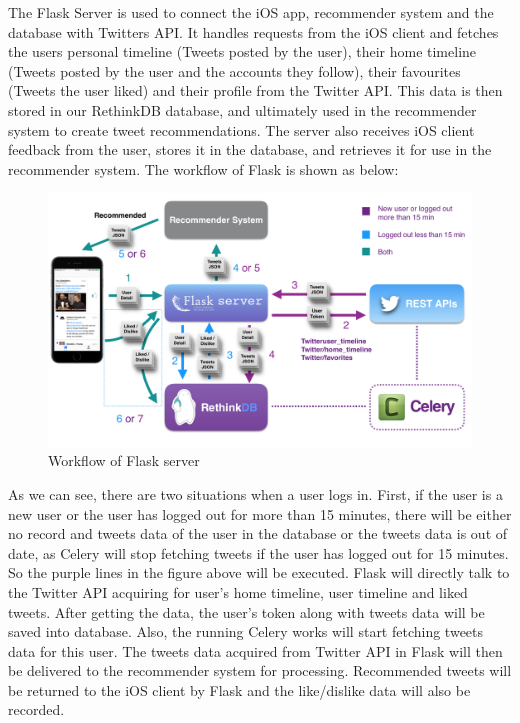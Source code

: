 \documentclass{article}
\begin{document}
The Flask Server is used to connect the iOS app, recommender system and the database with Twitters API. It handles requests from the iOS client and fetches the users personal timeline (Tweets posted by the user), their home timeline (Tweets posted by the user and the accounts they follow), their favourites (Tweets the user liked) and their profile from the Twitter API. This data is then stored in our RethinkDB database, and ultimately used in the recommender system to create tweet recommendations. The server also receives iOS client feedback from the user, stores it in the database, and retrieves it for use in the recommender system. The workflow of Flask is shown as below:

\begin{figure}[H]
    \centering
    \includegraphics[width=1.0\textwidth]{flask_workflow}  
    \caption{Workflow of Flask server}
\end{figure}

As we can see, there are two situations when a user logs in. First, if the user is a new user or the user has logged out for more than 15 minutes, there will be either no record and tweets data of the user in the database or the tweets data is out of date, as Celery will stop fetching tweets if the user has logged out for 15 minutes. So the purple lines in the figure above will be executed. Flask will directly talk to the Twitter API acquiring for user’s home timeline, user timeline and liked tweets. After getting the data, the user’s token along with tweets data will be saved into database. Also, the running Celery works will start fetching tweets data for this user. The tweets data acquired from Twitter API in Flask will then be delivered to the recommender system for processing. Recommended tweets will be returned to the iOS client by Flask and the like/dislike data will also be recorded. 
\end{document}

